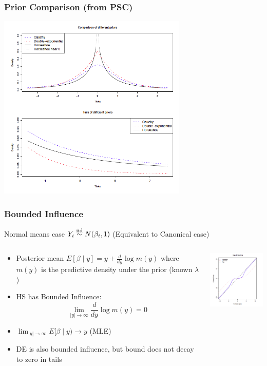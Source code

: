 \documentclass[]{beamer}
\begin{document}
\begin{frame}
\frametitle{Prior Comparison (from PSC)}
  \includegraphics[height=3.5in]{densities}
\end{frame}

\begin{frame}
  \frametitle{Bounded Influence}
Normal means case      $Y_i \mathrel{\mathop{\sim}\limits^{\rm iid}} N(\beta_i, 1)$    (Equivalent to Canonical case)
    \begin{columns}
    \begin{column}{.48\textwidth}
      \begin{itemize}
      \item
Posterior mean
$E[\beta \mid y] = y + \frac{d} {d y} \log m(y)$
where $m(y)$ is the predictive density under the prior (known $\lambda$) \pause
\item HS has Bounded Influence: $$\lim_{|y| \to \infty} \frac{d}{dy} \log m(y) = 0$$ \pause
\item $\lim_{|y| \to \infty} E[\beta \mid y) \to y $ (MLE)\pause
\item DE is also bounded influence, but bound does not decay to zero in tails
      \end{itemize}

    \end{column}
    \begin{column}{.48\textwidth}
   \includegraphics[width=2in]{shrinkage}
    \end{column}

    \end{columns}
\end{frame}
\end{document}
